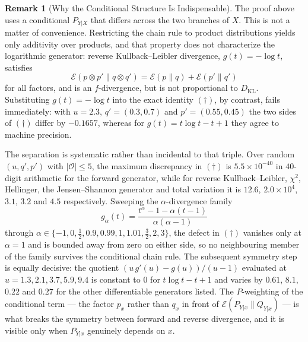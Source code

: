 \documentclass[12pt]{article}
\theoremstyle{definition}
\newtheorem{remark}[theorem]{Remark}
\begin{document}
\begin{remark}[Why the Conditional Structure Is Indispensable]
\label{rem:csiszar-conditional-needed}
The proof above uses a conditional $P_{Y|X}$ that differs across the two
branches of $X$.  This is not a matter of convenience.  Restricting the chain
rule to product distributions yields only additivity over products, and that
property does not characterize the logarithmic generator: reverse
Kullback--Leibler divergence, $g(t)=-\log t$, satisfies
\[
\mathcal E(p\otimes p'\|q\otimes q')=\mathcal E(p\|q)+\mathcal E(p'\|q')
\]
for all factors, and is an $f$-divergence, but is not proportional to
$D_{\mathrm{KL}}$.  Substituting $g(t)=-\log t$ into the exact identity
$(\dagger)$, by contrast, fails immediately: with $u=2.3$,
$q'=(0.3,0.7)$ and $p'=(0.55,0.45)$ the two sides of $(\dagger)$ differ by
$-0.1657$, whereas for $g(t)=t\log t-t+1$ they agree to machine precision.

The separation is systematic rather than incidental to that triple.  Over
random $(u,q',p')$ with $|\mathcal O|\le5$, the maximum discrepancy in
$(\dagger)$ is $5.5\times10^{-40}$ in $40$-digit arithmetic for the forward
generator, while for reverse Kullback--Leibler, $\chi^2$, Hellinger, the
Jensen--Shannon generator and total variation it is $12.6$, $2.0\times10^4$,
$3.1$, $3.2$ and $4.5$ respectively.  Sweeping the $\alpha$-divergence family
\[
g_\alpha(t)=\frac{t^\alpha-1-\alpha(t-1)}{\alpha(\alpha-1)}
\]
through $\alpha\in\{-1,0,\tfrac12,0.9,0.99,1,1.01,\tfrac32,2,3\}$, the defect in
$(\dagger)$ vanishes only at $\alpha=1$ and is bounded away from zero on either
side, so no neighbouring member of the family survives the conditional chain
rule.  The subsequent symmetry step is equally decisive: the quotient
$(u\,g'(u)-g(u))/(u-1)$ evaluated at $u=1.3,2.1,3.7,5.9,9.4$ is constant to
$0$ for $t\log t-t+1$ and varies by $0.61$, $8.1$, $0.22$ and $0.27$ for the
other differentiable generators listed.
The $P$-weighting of the conditional term --- the factor $p_x$ rather than
$q_x$ in front of $\mathcal E(P_{Y|x}\|Q_{Y|x})$ --- is what breaks the
symmetry between forward and reverse divergence, and it is visible only when
$P_{Y|x}$ genuinely depends on $x$.
\end{remark}
\end{document}
